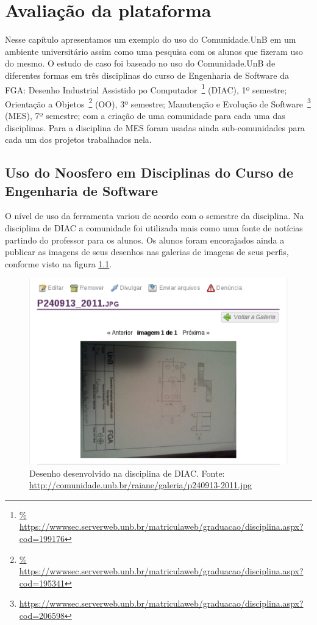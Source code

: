 \chapter{Avaliação da plataforma}

Nesse capítulo apresentamos um exemplo do uso do Comunidade.UnB em um ambiente
universitário assim como uma pesquisa com os alunos que fizeram uso do mesmo.
%
O estudo de caso foi baseado no uso do Comunidade.UnB de diferentes formas em
três disciplinas do curso de Engenharia de Software da FGA:
%
Desenho Industrial Assistido po Computador~\footnote{\url{%
https://wwwsec.serverweb.unb.br/matriculaweb/graduacao/disciplina.aspx?cod=199176}} (DIAC), 1º semestre;
%
Orientação a Objetos~\footnote{\url{%
https://wwwsec.serverweb.unb.br/matriculaweb/graduacao/disciplina.aspx?cod=195341}}
(OO), 3º semestre;
%
Manutenção e Evolução de Software~\footnote{\url{
https://wwwsec.serverweb.unb.br/matriculaweb/graduacao/disciplina.aspx?cod=206598}}
(MES), 7º semestre; 
%
com a criação de uma comunidade para cada uma das disciplinas. Para a disciplina de
MES foram usadas ainda sub-comunidades para cada um dos projetos trabalhados nela.

\section{Uso do Noosfero em Disciplinas do Curso de Engenharia de Software}
\label{mes-unb}

O nível de uso da ferramenta variou de acordo com o semestre da disciplina. Na
disciplina de DIAC a comunidade foi utilizada mais como uma fonte de notícias
partindo do professor para os alunos. Os alunos foram encorajados ainda a publicar
as imagens de seus desenhos nas galerias de imagens de seus perfis, conforme
visto na figura \ref{imagem-diac}.

\begin{figure}[h!]
    \centering
    \includegraphics[keepaspectratio=true,scale=0.65]
      {figuras/imagem-diac.eps}
    \caption{Desenho desenvolvido na disciplina de DIAC. Fonte: 
\url{http://comunidade.unb.br/raiane/galeria/p240913-2011.jpg}}
    \label{imagem-diac}
\end{figure}


